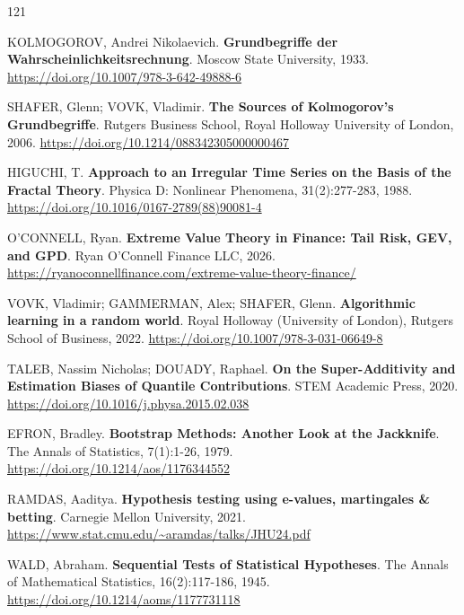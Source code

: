 \begin{thebibliography}{121}

  KOLMOGOROV, Andrei Nikolaevich.
  \newblock \textbf{Grundbegriffe der Wahrscheinlichkeitsrechnung}.
  \newblock Moscow State University, 1933.
  \newblock \url{https://doi.org/10.1007/978-3-642-49888-6}

  SHAFER, Glenn; VOVK, Vladimir.
  \newblock \textbf{The Sources of Kolmogorov’s Grundbegriffe}.
  \newblock Rutgers Business School, Royal Holloway University of London, 2006.
  \newblock \url{https://doi.org/10.1214/088342305000000467}

  HIGUCHI, T.
  \newblock \textbf{Approach to an Irregular Time Series on the Basis of the Fractal Theory}.
  \newblock Physica D: Nonlinear Phenomena, 31(2):277-283, 1988.
  \newblock \url{https://doi.org/10.1016/0167-2789(88)90081-4}

  O'CONNELL, Ryan.
  \newblock \textbf{Extreme Value Theory in Finance: Tail Risk, GEV, and GPD}.
  \newblock Ryan O'Connell Finance LLC, 2026.
  \newblock \url{https://ryanoconnellfinance.com/extreme-value-theory-finance/}

  VOVK, Vladimir; GAMMERMAN, Alex; SHAFER, Glenn.
  \newblock \textbf{Algorithmic learning in a random world}.
  \newblock Royal Holloway (University of London), Rutgers School of Business, 2022.
  \newblock \url{https://doi.org/10.1007/978-3-031-06649-8}

  TALEB, Nassim Nicholas; DOUADY, Raphael.
  \newblock \textbf{On the Super-Additivity and Estimation Biases of Quantile Contributions}.
  \newblock STEM Academic Press, 2020.
  \newblock \url{https://doi.org/10.1016/j.physa.2015.02.038}

  EFRON, Bradley.
  \newblock \textbf{Bootstrap Methods: Another Look at the Jackknife}.
  \newblock The Annals of Statistics, 7(1):1-26, 1979.
  \newblock \url{https://doi.org/10.1214/aos/1176344552}

  RAMDAS, Aaditya.
  \newblock \textbf{Hypothesis testing using e-values, martingales \& betting}.
  \newblock Carnegie Mellon University, 2021.
  \newblock \url{https://www.stat.cmu.edu/~aramdas/talks/JHU24.pdf}

  WALD, Abraham.
  \newblock \textbf{Sequential Tests of Statistical Hypotheses}.
  \newblock The Annals of Mathematical Statistics, 16(2):117-186, 1945.
  \newblock \url{https://doi.org/10.1214/aoms/1177731118}


\end{thebibliography}
